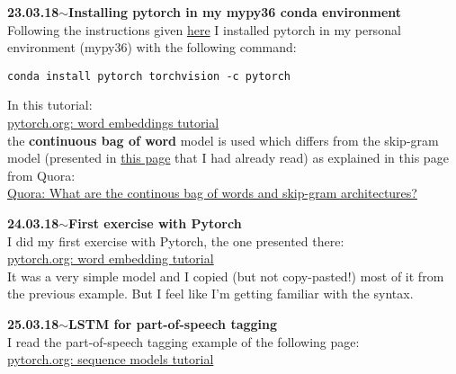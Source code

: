 \documentclass[11pt,a4paper]{article}
\newenvironment{loggentry}[2]%
{\noindent\textbf{#1}\hspace{1cm}$\mathbf{\sim}$\text{ }\textbf{#2}\\}{\vspace{0.5cm}}
\begin{document}
\begin{loggentry}{23.03.18}{Installing pytorch in my mypy36 conda environment}
Following the instructions given \href{http://pytorch.org/}{here} I installed pytorch in my personal environment (mypy36) with the following command:
\begin{verbatim}
conda install pytorch torchvision -c pytorch
\end{verbatim}
In this tutorial:\\
\href{http://pytorch.org/tutorials/beginner/nlp/word_embeddings_tutorial.html}{pytorch.org: word embeddings tutorial}\\
the \textbf{continuous bag of word} model is used which differs from the skip-gram model (presented in \href{http://mccormickml.com/2016/04/19/word2vec-tutorial-the-skip-gram-model/}{this page} that I had already read) as explained in this page from Quora:\\
\href{https://www.quora.com/What-are-the-continuous-bag-of-words-and-skip-gram-architectures}{Quora: What are the continous bag of words and skip-gram architectures?}\\
\end{loggentry}

\begin{loggentry}{24.03.18}{First exercise with Pytorch}
I did my first exercise with Pytorch, the one presented there:\\
\href{http://pytorch.org/tutorials/beginner/nlp/word_embeddings_tutorial.html}{pytorch.org: word embedding tutorial}\\
It was a very simple model and I copied (but not copy-pasted!) most of it from the previous example. But I feel like I'm getting familiar with the syntax.
\end{loggentry}

\begin{loggentry}{25.03.18}{LSTM for part-of-speech tagging}
I read the part-of-speech tagging example of the following page:\\
\href{http://pytorch.org/tutorials/beginner/nlp/sequence_models_tutorial.html}{pytorch.org: sequence models tutorial}
\end{loggentry}
\end{document}

